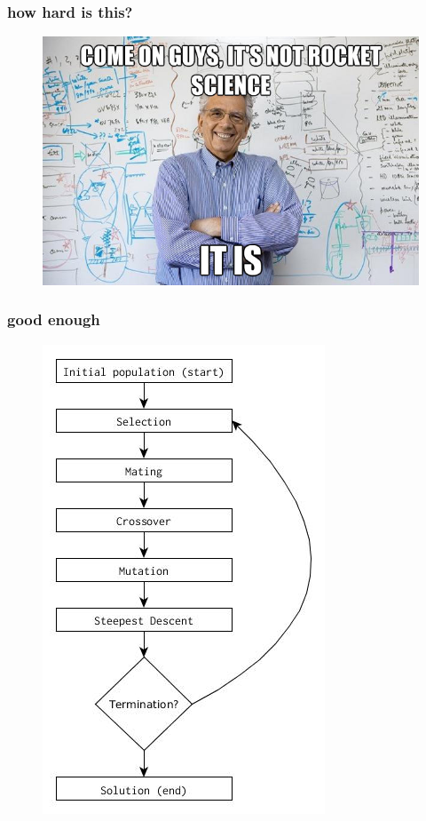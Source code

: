 \documentclass{beamer}
\begin{document}
\begin{frame}
	\frametitle{how hard is this?}

	\begin{figure}
	\centering
	\includegraphics[scale=0.4]{figs/np-complete}
	\end{figure}
	
\end{frame}


\begin{frame}
	\frametitle{good enough}
	\begin{figure}
	\centering
	\includegraphics[scale=0.35]{figs/genetic_algorithm}
	\end{figure}
	
\end{frame}
\end{document}
